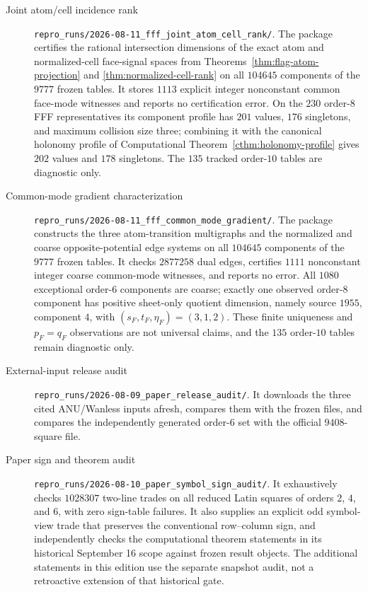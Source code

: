 \begin{description}
\item[Joint atom/cell incidence rank]
\nolinkurl{repro_runs/2026-08-11_fff_joint_atom_cell_rank/}.
The package certifies the rational intersection dimensions of the exact atom
and normalized-cell face-signal spaces from
Theorems~\ref{thm:flag-atom-projection} and
\ref{thm:normalized-cell-rank} on all $104645$ components of the
$9777$ frozen tables.  It stores $1113$ explicit integer nonconstant common
face-mode witnesses and reports no certification error.  On the $230$
order-$8$ FFF representatives its component profile has $201$ values, $176$
singletons, and maximum collision size three; combining it with the canonical
holonomy profile of Computational Theorem~\ref{cthm:holonomy-profile} gives
$202$ values and $178$ singletons.  The $135$ tracked order-$10$ tables are
diagnostic only.

\item[Common-mode gradient characterization]
\nolinkurl{repro_runs/2026-08-11_fff_common_mode_gradient/}.
The package constructs the three atom-transition multigraphs and the
normalized and coarse opposite-potential edge systems on all $104645$
components of the $9777$ frozen tables.  It checks $2877258$ dual edges,
certifies $1111$ nonconstant integer coarse common-mode witnesses, and
reports no error.  All $1080$ exceptional order-$6$ components are coarse;
exactly one observed order-$8$ component has positive sheet-only quotient
dimension, namely source $1955$, component $4$, with $(s_F,t_F,\eta_F)=(3,1,2)$.
These finite uniqueness and $p_F=q_F$ observations are not universal claims,
and the $135$ order-$10$ tables remain diagnostic only.

\item[External-input release audit]
\nolinkurl{repro_runs/2026-08-09_paper_release_audit/}.
It downloads the three cited ANU/Wanless inputs afresh, compares them with the
frozen files, and compares the independently generated order-$6$ set with the
official $9408$-square file.

\item[Paper sign and theorem audit]
\nolinkurl{repro_runs/2026-08-10_paper_symbol_sign_audit/}.
It exhaustively checks $1028307$ two-line trades on all reduced Latin squares
of orders $2$, $4$, and $6$, with zero sign-table failures.  It also supplies
an explicit odd symbol-view trade that preserves the conventional
row--column sign, and independently checks the computational theorem
statements in its historical September 16 scope against frozen result
objects. The additional statements in this edition use the separate
snapshot audit, not a retroactive extension of that historical gate.
\end{description}

